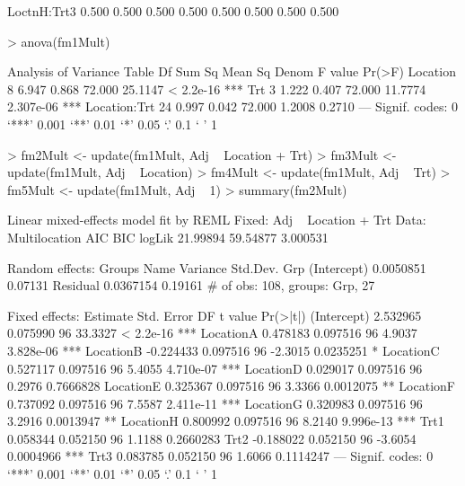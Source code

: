 \documentclass[12pt]{article}
\begin{document}
\begin{Schunk}
\begin{Soutput}
LoctnH:Trt3  0.500  0.500  0.500  0.500  0.500  0.500  0.500  0.500
\end{Soutput}
\begin{Sinput}
> anova(fm1Mult)
\end{Sinput}
\begin{Soutput}
Analysis of Variance Table
             Df Sum Sq Mean Sq  Denom F value    Pr(>F)    
Location      8  6.947   0.868 72.000 25.1147 < 2.2e-16 ***
Trt           3  1.222   0.407 72.000 11.7774 2.307e-06 ***
Location:Trt 24  0.997   0.042 72.000  1.2008    0.2710    
---
Signif. codes:  0 `***' 0.001 `**' 0.01 `*' 0.05 `.' 0.1 ` ' 1 
\end{Soutput}
\begin{Sinput}
> fm2Mult <- update(fm1Mult, Adj ~ Location + Trt)
> fm3Mult <- update(fm1Mult, Adj ~ Location)
> fm4Mult <- update(fm1Mult, Adj ~ Trt)
> fm5Mult <- update(fm1Mult, Adj ~ 1)
> summary(fm2Mult)
\end{Sinput}
\begin{Soutput}
Linear mixed-effects model fit by REML
Fixed: Adj ~ Location + Trt 
 Data: Multilocation 
      AIC      BIC   logLik
 21.99894 59.54877 3.000531

Random effects:
 Groups   Name        Variance  Std.Dev.
 Grp      (Intercept) 0.0050851 0.07131 
 Residual             0.0367154 0.19161 
# of obs: 108, groups: Grp, 27

Fixed effects:
             Estimate Std. Error DF t value  Pr(>|t|)    
(Intercept)  2.532965   0.075990 96 33.3327 < 2.2e-16 ***
LocationA    0.478183   0.097516 96  4.9037 3.828e-06 ***
LocationB   -0.224433   0.097516 96 -2.3015 0.0235251 *  
LocationC    0.527117   0.097516 96  5.4055 4.710e-07 ***
LocationD    0.029017   0.097516 96  0.2976 0.7666828    
LocationE    0.325367   0.097516 96  3.3366 0.0012075 ** 
LocationF    0.737092   0.097516 96  7.5587 2.411e-11 ***
LocationG    0.320983   0.097516 96  3.2916 0.0013947 ** 
LocationH    0.800992   0.097516 96  8.2140 9.996e-13 ***
Trt1         0.058344   0.052150 96  1.1188 0.2660283    
Trt2        -0.188022   0.052150 96 -3.6054 0.0004966 ***
Trt3         0.083785   0.052150 96  1.6066 0.1114247    
---
Signif. codes:  0 `***' 0.001 `**' 0.01 `*' 0.05 `.' 0.1 ` ' 1 


\end{Soutput}
\end{Schunk}
\end{document}
